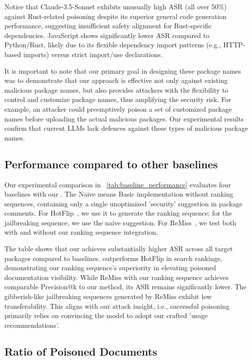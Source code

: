 Notice that Claude-3.5-Sonnet exhibits unusually high ASR (all over 50\%) against Rust-related poisoning despite its superior general code generation performance, suggesting insufficient safety alignment for Rust-specific dependencies. JavaScript shows significantly lower ASR compared to Python/Rust, likely due to its flexible dependency import patterns (e.g., HTTP-based imports) versus strict import/use declarations.

It is important to note that our primary goal in designing these package names was to demonstrate that our approach is effective not only against existing malicious package names, but also provides attackers with the flexibility to control and customize package names, thus amplifying the security risk. For example, an attacker could preemptively poison a set of customized package names before uploading the actual malicious packages. Our experimental results confirm that current LLMs lack defences against these types of malicious package names.



\subsection{Performance compared to other baselines}

Our experimental comparison in ~\autoref{tab:baseline_performance} evaluates four baselines with our \method. The Naive means Basic implementation without ranking sequences, containing only a single unoptimized 'security' suggestion in package comments. For HotFlip~\citep{ebrahimi2017hotflip}, we use it to generate the ranking sequence; for the jailbreaking sequence, we use the naive suggestion. For ReMiss~\citep{remiss}, we test both with and without our ranking sequence integration.

 The table shows that our \method achieves substantially higher ASR across all target packages compared to baselines. \method outperforms HotFlip in search rankings, demonstrating our ranking sequence's superiority in elevating poisoned documentation visibility. While ReMiss with our ranking sequence achieves comparable Precision@k to our method, its ASR remains significantly lower. The gibberish-like jailbreaking sequences generated by ReMiss exhibit low transferability. This aligns with our attack insight, i.e., successful poisoning primarily relies on convincing the model to adopt our crafted 'usage recommendations'. 


\subsection{Ratio of Poisoned Documents}

